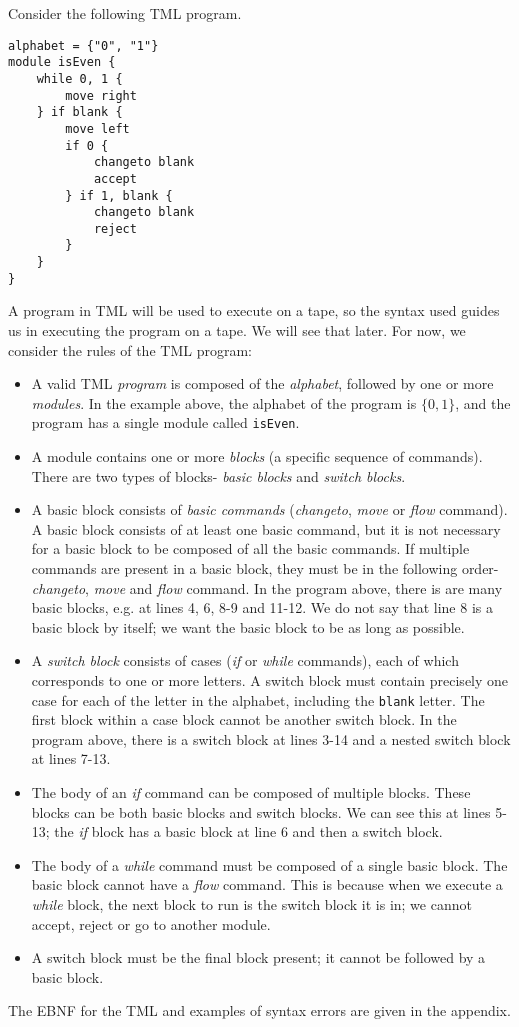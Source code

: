 Consider the following TML program.
\begin{lstlisting}[language=TML]
alphabet = {"0", "1"}
module isEven {
    while 0, 1 {
        move right
    } if blank {
        move left
        if 0 {
            changeto blank
            accept
        } if 1, blank {
            changeto blank
            reject
        }
    }
}
\end{lstlisting}
A program in TML will be used to execute on a tape, so the syntax used guides us in executing the program on a tape. We will see that later. For now, we consider the rules of the TML program:
\begin{itemize}
    \item A valid TML \emph{program} is composed of the \emph{alphabet}, followed by one or more \emph{modules}. In the example above, the alphabet of the program is $\{0, 1\}$, and the program has a single module called \texttt{isEven}.
    \item A module contains one or more \emph{blocks} (a specific sequence of commands). There are two types of blocks- \emph{basic blocks} and \emph{switch blocks}.
    \item A basic block consists of \emph{basic commands} (\textit{changeto}, \textit{move} or \textit{flow} command). A basic block consists of at least one basic command, but it is not necessary for a basic block to be composed of all the basic commands. If multiple commands are present in a basic block, they must be in the following order- \textit{changeto}, \textit{move} and \textit{flow} command. In the program above, there is are many basic blocks, e.g. at lines 4, 6, 8-9 and 11-12. We do not say that line 8 is a basic block by itself; we want the basic block to be as long as possible.
    \item A \emph{switch block} consists of cases (\textit{if} or \textit{while} commands), each of which corresponds to one or more letters. A switch block must contain precisely one case for each of the letter in the alphabet, including the \texttt{blank} letter. The first block within a case block cannot be another switch block. In the program above, there is a switch block at lines 3-14 and a nested switch block at lines 7-13.
    \item The body of an \textit{if} command can be composed of multiple blocks. These blocks can be both basic blocks and switch blocks. We can see this at lines 5-13; the \textit{if} block has a basic block at line 6 and then a switch block.
    \item The body of a \textit{while} command must be composed of a single basic block. The basic block cannot have a \textit{flow} command. This is because when we execute a \textit{while} block, the next block to run is the switch block it is in; we cannot accept, reject or go to another module.
    \item A switch block must be the final block present; it cannot be followed by a basic block.
\end{itemize}
The EBNF for the TML and examples of syntax errors are given in the appendix. 

